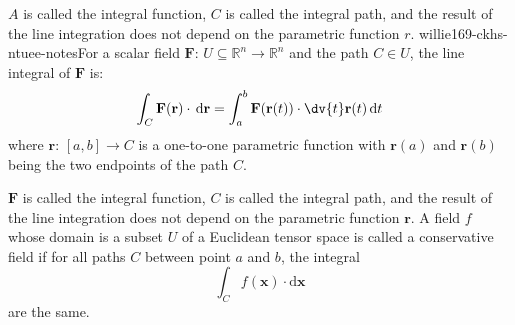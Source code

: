 \documentclass[a4paper,12pt]{report}
\begin{document}
\begin{itemize}
\begin{itemize}
$A$ is called the integral function, $C$ is called the integral path, and the result of the line integration does not depend on the parametric function $r$.
willie169-ckhs-ntuee-notesFor a scalar field $\mathbf{F}: \,U\subseteq \mathbb {R} ^{n}\to \mathbb {R}^n$ and the path $C \in U$, the line integral of $\mathbf{F}$ is: 
\[\int _{C}\mathbf {F} (\mathbf {r} )\cdot \,\mathrm {d} \mathbf{r}=\int _{a}^{b}\mathbf {F} (\mathbf {r} (t))\cdot \dv{t}\mathbf {r} (t)\,\mathrm {d} t\]
where $\mathbf{r}:\, [a, b] \to C$ is a one-to-one parametric function with $\mathbf{r}(a)$ and $\mathbf{r}(b)$ being the two endpoints of the path $C$. 

$\mathbf{F}$ is called the integral function, $C$ is called the integral path, and the result of the line integration does not depend on the parametric function $\mathbf{r}$.
A field $f$ whose domain is a subset $U$ of a Euclidean tensor space is called a conservative field if for all paths $C$ between point $a$ and $b$, the integral 
\[\int_Cf(\mathbf{x})\cdot\mathrm{d}\mathbf{x}\]
are the same.


\end{itemize}
\end{itemize}
\end{document}
